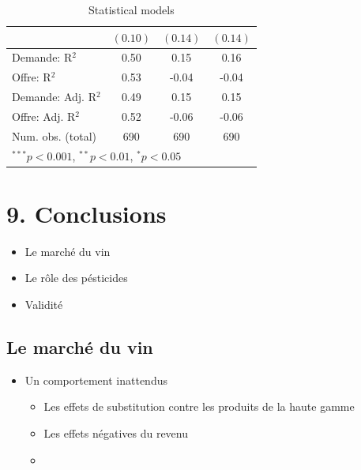 \documentclass[11pt,]{article}
\providecommand{\tightlist}{%
  \setlength{\itemsep}{0pt}\setlength{\parskip}{0pt}}
\begin{document}
\begin{table}[!htbp]
\begin{center}
\begin{tabular}{l c c c }
                    & $(0.10)$      & $(0.14)$       & $(0.14)$       \\
\hline
Demande: R$^2$      & 0.50          & 0.15           & 0.16           \\
Offre: R$^2$        & 0.53          & -0.04          & -0.04          \\
Demande: Adj. R$^2$ & 0.49          & 0.15           & 0.15           \\
Offre: Adj. R$^2$   & 0.52          & -0.06          & -0.06          \\
Num. obs. (total)   & 690           & 690            & 690            \\
\hline
\multicolumn{4}{l}{\scriptsize{$^{***}p<0.001$, $^{**}p<0.01$, $^*p<0.05$}}
\end{tabular}
\caption{Statistical models}
\label{table : ols, 2sls et 3sls, full information clusters}
\end{center}
\end{table}

\FloatBarrier

\hypertarget{conclusions}{%
\section{9. Conclusions}\label{conclusions}}

\begin{itemize}
\tightlist
\item
  Le marché du vin
\item
  Le rôle des pésticides\\
\item
  Validité
\end{itemize}

\FloatBarrier

\hypertarget{le-marche-du-vin}{%
\subsection{Le marché du vin}\label{le-marche-du-vin}}

\begin{itemize}
\tightlist
\item
  Un comportement inattendus

  \begin{itemize}
  \item
    Les effets de substitution contre les produits de la haute gamme
  \item
    Les effets négatives du revenu
  \item
  \end{itemize}
\end{itemize}
\end{document}
